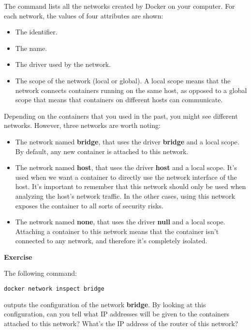 \documentclass[
]{article}
\providecommand{\tightlist}{%
  \setlength{\itemsep}{0pt}\setlength{\parskip}{0pt}}
\newenvironment{infobox}[1]
  {
  \begin{itemize}
  \renewcommand{\labelitemi}{
    \raisebox{-.7\height}[0pt][0pt]{
      
    }
  }
  \setlength{\fboxsep}{1em}
  \begin{whitebox}
  \item
  }
  {
  \end{whitebox}
  \end{itemize}
  }
\theoremstyle{definition}
\theoremstyle{definition}
\theoremstyle{definition}
\theoremstyle{remark}
\let\BeginKnitrBlock\begin \let\EndKnitrBlock\end
\begin{document}
\begin{infobox}{exercisebox}

The command lists all the networks created by Docker on
your computer.
For each network, the values of four attributes are shown:

\begin{itemize}
\tightlist
\item
  The identifier.
\item
  The name.
\item
  The driver used by the network.
\item
  The scope of the network (local or global).
  A local scope means that the network connects containers
  running on the same host, as opposed to a global scope that
  means that containers on different hosts can communicate.
\end{itemize}

Depending on the containers that you used
in the past, you might see different networks.
However, three networks are worth noting:

\begin{itemize}
\tightlist
\item
  The network named \textbf{bridge}, that uses the driver \textbf{bridge} and a local scope.
  By default, any new container is attached to this network.
\item
  The network named \textbf{host}, that uses the driver \textbf{host} and a local scope.
  It's used when we want a container to directly use the network interface of the host.
  It's important to remember that this network should only be used when analyzing the
  host's network traffic. In the other cases, using this network exposes
  the container to all sorts of security risks.
\item
  The network named \textbf{none}, that uses the driver \textbf{null} and a local scope.
  Attaching a container to this network means that the container
  isn't connected to any network, and therefore it's completely isolated.
\end{itemize}

\end{infobox}

\begin{infobox}{exercisebox}

\textbf{Exercise}

\BeginKnitrBlock{exercise}
\protect\hypertarget{exr:unnamed-chunk-32}{}{\label{exr:unnamed-chunk-32} }The following command:

\texttt{docker\ network\ inspect\ bridge}

outputs the configuration of the network \textbf{bridge}.
By looking at this configuration, can you tell
what IP addresses will be given to the containers attached to this
network? What's the IP address of the router of this network?
\EndKnitrBlock{exercise}

\end{infobox}
\end{document}
